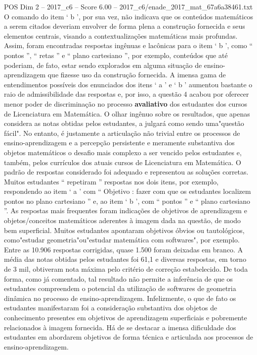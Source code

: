 \begin{textsample}{POS Dim 2 – 2017\_c6 – Score 6.00 – 2017\_c6/enade\_2017\_mat\_67a6a38461.txt}
O comando do item ‘ b ’, por sua vez, não indicava que os conteúdos matemáticos a serem citados deveriam envolver de forma plena a construção fornecida e seus elementos centrais, visando a contextualizações matemáticas mais profundas.
Assim, foram encontradas respostas ingênuas e lacônicas para o item ‘ b ’, como “ pontos ”, “ retas ” e “ plano cartesiano ”, por exemplo, conteúdos que até poderiam, de fato, estar sendo explorados em alguma situação de ensino-aprendizagem que fizesse uso da construção fornecida.
A imensa gama de entendimentos possíveis dos enunciados dos itens ‘ a ’ e ‘ b ’ aumentou bastante o raio de admissibilidade das respostas e, por isso, a questão 4 acabou por oferecer menor poder de discriminação no processo \textbf{avaliativo} dos estudantes dos cursos de Licenciatura em Matemática.
O olhar ingênuo sobre os resultados, que apenas considera as notas obtidas pelos estudantes, a julgará como sendo uma"questão fácil".
No entanto, é justamente a articulação não trivial entre os processos de ensino-aprendizagem e a percepção persistente e meramente substantiva dos objetos matemáticos o desafio mais complexo a ser vencido pelos estudantes e, também, pelos currículos dos atuais cursos de Licenciatura em Matemática.
O padrão de respostas considerado foi adequado e representou as soluções corretas.
Muitos estudantes “ repetiram ” respostas nos dois itens, por exemplo, respondendo ao item ‘ a ’ com “ Objetivo : fazer com que os estudantes localizem pontos no plano cartesiano ” e, ao item ‘ b ’, com “ pontos ” e “ plano cartesiano ”.
As respostas mais frequentes foram indicações de objetivos de aprendizagem e objetos/conceitos matemáticos aderentes à imagem dada na questão, de modo bem superficial.
Muitos estudantes apontaram objetivos óbvios ou tautológicos, como"estudar geometria"ou"estudar matemática com softwares", por exemplo.
Entre as 10.906 respostas corrigidas, quase 1.500 foram deixadas em branco.
A média das notas obtidas pelos estudantes foi 61,1 e diversas respostas, em torno de 3 mil, obtiveram nota máxima pelo critério de correção estabelecido.
De toda forma, como já comentado, tal resultado não permite a inferência de que os estudantes compreendem o potencial da utilização de softwares de geometria dinâmica no processo de ensino-aprendizagem.
Infelizmente, o que de fato os estudantes manifestaram foi a consideração substantiva dos objetos de conhecimento presentes em objetivos de aprendizagem superficiais e pobremente relacionados à imagem fornecida.
Há de se destacar a imensa dificuldade dos estudantes em abordarem objetivos de forma técnica e articulada aos processos de ensino-aprendizagem.

\end{textsample}
